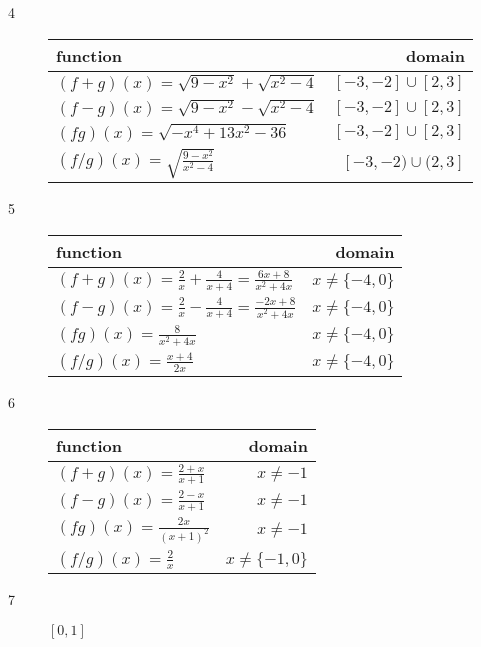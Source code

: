 \documentclass{exam}
\begin{document}
\begin{description}
    \item[4] 
      \begin{tabular}{lr}
        \toprule
        function & domain \\
        \midrule
        $(f + g)(x) = \sqrt{9 - x^2} + \sqrt{x^2 - 4}$  & $[-3, -2] \cup [2, 3]$ \\
        \midrule
        $(f - g)(x) = \sqrt{9 - x^2} - \sqrt{x^2 - 4}$  & $[-3, -2] \cup [2, 3]$ \\
        \midrule
        $(fg)(x)    = \sqrt{-x^4 + 13x^2 - 36}$         & $[-3, -2] \cup [2, 3]$ \\
        \midrule
        $(f/g)(x)   = \sqrt{ \frac{9 - x^2}{x^2 - 4} }$ & $[-3, -2) \cup (2, 3]$ \\
        \bottomrule
      \end{tabular}

    \item[5] 
      \begin{tabular}{lr}
        \toprule
        function & domain \\
        \midrule
        $(f + g)(x) = \frac{2}{x} + \frac{4}{x + 4} = \frac{6x + 8}{x^2 + 4x}$  & $x \neq \{-4, 0\}$ \\
        \midrule
        $(f - g)(x) = \frac{2}{x} - \frac{4}{x + 4} = \frac{-2x + 8}{x^2 + 4x}$ & $x \neq \{-4, 0\}$ \\
        \midrule
        $(fg)(x)  = \frac{8}{x^2 + 4x}$ & $x \neq \{-4, 0\}$ \\
        \midrule
        $(f/g)(x) = \frac{x + 4}{2x}$   & $x \neq \{-4, 0\}$ \\
        \bottomrule
      \end{tabular}

    \item[6] 
      \begin{tabular}{lr}
        \toprule
        function & domain \\
        \midrule
        $(f + g)(x) = \frac{2 + x}{x + 1}$  & $x \neq -1$ \\
        \midrule
        $(f - g)(x) = \frac{2 - x}{x + 1}$  & $x \neq -1$ \\
        \midrule
        $(fg)(x)    = \frac{2x}{(x + 1)^2}$ & $x \neq -1$ \\
        \midrule
        $(f/g)(x)   = \frac{2}{x}$          & $x \neq \{-1, 0\}$ \\
        \bottomrule
      \end{tabular}

    \item[7] $[0, 1]$


\end{description}
\end{document}
